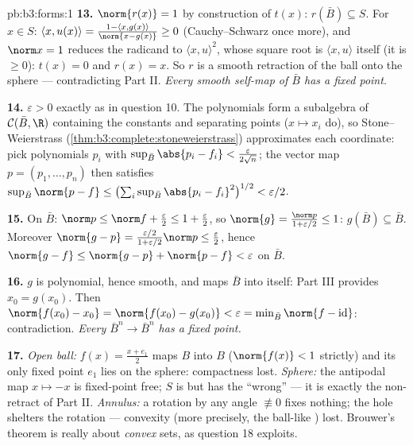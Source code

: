 \begin{solution}{pb:b3:forms:1}
\textbf{13.} $\norm{r(x)} = 1$ by construction of $t(x)$:
$r(\bar B) \subseteq S$. For $x \in S$: $\langle x,
u(x)\rangle = \frac{1 - \langle x, g(x)\rangle}{\norm{x -
g(x)}} \geq 0$ (Cauchy--Schwarz once more), and $\norm x =
1$ reduces the radicand to $\langle x, u\rangle^2$, whose
square root is $\langle x, u\rangle$ itself (it is $\geq
0$): $t(x) = 0$ and $r(x) = x$. So $r$ is a smooth
retraction of the ball onto the sphere --- contradicting
Part II. \emph{Every smooth self-map of $\bar B$ has a
fixed point.}

\textbf{14.} $\varepsilon > 0$ exactly as in question 10.
The polynomials form a subalgebra of $\mathcal C(\bar B,
\R)$ containing the constants and separating points ($x
\mapsto x_i$ do), so Stone--Weierstrass
(\cref{thm:b3:complete:stoneweierstrass}) approximates each
coordinate: pick polynomials $p_i$ with $\sup_{\bar
B}\abs{p_i - f_i} < \frac{\varepsilon}{2\sqrt n}$; the
vector map $p = (p_1, \dots, p_n)$ then satisfies
$\sup_{\bar B}\norm{p - f} \leq
\bigl(\sum_i\sup_{\bar B}\abs{p_i - f_i}^2\bigr)^{1/2} <
\varepsilon/2$.

\textbf{15.} On $\bar B$: $\norm p \leq \norm f +
\frac\varepsilon2 \leq 1 + \frac\varepsilon2$, so
$\norm{g} = \frac{\norm p}{1 + \varepsilon/2} \leq 1$:
$g(\bar B) \subseteq \bar B$. Moreover $\norm{g - p} =
\frac{\varepsilon/2}{1 + \varepsilon/2}\norm p \leq
\frac\varepsilon2$, hence $\norm{g - f} \leq \norm{g - p} +
\norm{p - f} < \varepsilon$ on $\bar B$.

\textbf{16.} $g$ is polynomial, hence smooth, and maps
$\bar B$ into itself: Part III provides $x_0 = g(x_0)$.
Then $\norm{f(x_0) - x_0} = \norm{f(x_0) - g(x_0)} <
\varepsilon = \min_{\bar B}\norm{f - \operatorname{id}}$:
contradiction. \emph{Every  $\bar B^n \to
\bar B^n$ has a fixed point.}

\textbf{17.} \emph{Open ball:} $f(x) = \frac{x + e_1}2$ maps
$B$ into $B$ ($\norm{f(x)} < 1$ strictly) and its only fixed
point $e_1$ lies on the sphere: compactness lost.
\emph{Sphere:} the antipodal map $x \mapsto -x$ is
fixed-point free; $S$ is  but has the ``wrong''
 --- it is exactly the non-retract of Part II.
\emph{Annulus:} a rotation by any angle $\not\equiv 0$ fixes
nothing; the hole shelters the rotation --- convexity (more
precisely, the ball-like ) lost. Brouwer's theorem
is really about \emph{ convex} sets, as question 18
exploits.


\end{solution}
